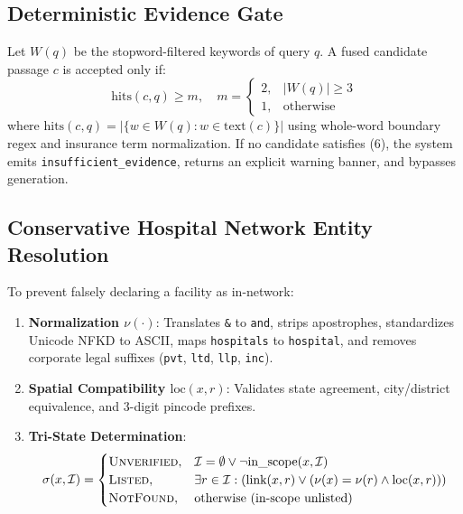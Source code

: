 \documentclass[conference]{IEEEtran}
\begin{document}
\subsection{Deterministic Evidence Gate}
Let $W(q)$ be the stopword-filtered keywords of query $q$. A fused candidate passage $c$ is accepted only if:
\begin{equation}
\text{hits}(c, q) \ge m, \quad m = \begin{cases} 2, & |W(q)| \ge 3 \\ 1, & \text{otherwise} \end{cases}
\end{equation}
where $\text{hits}(c, q) = |\{w \in W(q) : w \in \text{text}(c)\}|$ using whole-word boundary regex and insurance term normalization. If no candidate satisfies (6), the system emits \texttt{insufficient\_evidence}, returns an explicit warning banner, and bypasses generation.

\subsection{Conservative Hospital Network Entity Resolution}
To prevent falsely declaring a facility as in-network:
\begin{enumerate}
    \item \textbf{Normalization $\nu(\cdot)$}: Translates \texttt{\&} to \texttt{and}, strips apostrophes, standardizes Unicode NFKD to ASCII, maps \texttt{hospitals} to \texttt{hospital}, and removes corporate legal suffixes (\texttt{pvt}, \texttt{ltd}, \texttt{llp}, \texttt{inc}).
    \item \textbf{Spatial Compatibility $\text{loc}(x, r)$}: Validates state agreement, city/district equivalence, and 3-digit pincode prefixes.
    \item \textbf{Tri-State Determination}:
    \begin{equation}
    \sigma(x, \mathcal{I}) = \begin{cases} 
    \textsc{Unverified}, & \mathcal{I} = \emptyset \lor \neg \text{in\_scope}(x, \mathcal{I}) \\ 
    \textsc{Listed}, & \exists r \in \mathcal{I} : (\text{link}(x, r) \lor (\nu(x) = \nu(r) \land \text{loc}(x, r))) \\ 
    \textsc{NotFound}, & \text{otherwise (in-scope unlisted)} 
    \end{cases}
    \end{equation}
\end{enumerate}
\end{document}
